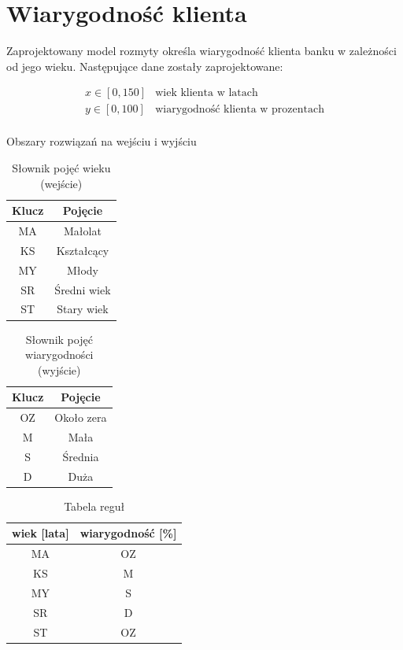 \section{Wiarygodność klienta}
Zaprojektowany model rozmyty określa wiarygodność klienta banku w zależności od jego wieku. Następujące dane zostały zaprojektowane:

\begin{equation}
\begin{array}{rl}
x \in [0,150] & \textrm{wiek klienta w latach} \\
y \in [0,100] & \textrm{wiarygodność klienta w prozentach} \\
\end{array}
\end{equation}
\begin{center}Obszary rozwiązań na wejściu i wyjściu\end{center}

\begin{table}[h]
\centering
\begin{tabular}[t]{c|c}
Klucz & Pojęcie \\
\hline
MA & Małolat \\
KS & Kształcący \\
MY & Młody \\
SR & Średni wiek \\
ST & Stary wiek \\
\end{tabular}
\caption{\label{tab:xor}Słownik pojęć wieku (wejście)}
\end{table}

\begin{table}[h]
\centering
\begin{tabular}[t]{c|c}
Klucz & Pojęcie \\
\hline
OZ & Około zera \\
M & Mała \\
S & Średnia \\
D & Duża \\
\end{tabular}
\caption{\label{tab:xor}Słownik pojęć wiarygodności (wyjście)}
\end{table}

\begin{table}[h]
\centering
\begin{tabular}[t]{c|c}
wiek [lata] & wiarygodność [\%] \\
\hline
MA & OZ \\
KS & M \\
MY & S \\
SR & D \\
ST & OZ \\
\end{tabular}
\caption{\label{tab:xor}Tabela reguł}
\end{table}

